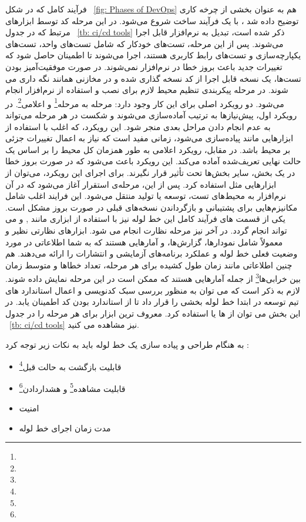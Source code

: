 فرآیند کامل  که در شکل
~\ref{fig: Phases of DevOps}
هم به عنوان بخشی از چرخه کاری توضیح داده شد \cite{DevopsCD}، با یک فرآیند ساخت شروع می‌شود. در این مرحله کد توسط ابزارهای مرتبط که در جدول
~\ref{tb: ci/cd tools}
ذکر شده است، تبدیل به نرم‌افزار قابل اجرا می‌شوند. پس از این مرحله، تست‌های خودکار که شامل تست‌های واحد، تست‌های یکپارچه‌سازی و تست‌های رابط کاربری هستند، اجرا می‌شوند تا اطمینان حاصل شود که تغییرات جدید باعث بروز خطا در نرم‌افزار نمی‌شوند. در صورت موفقیت‌آمیز بودن تست‌ها، یک نسخه قابل اجرا از کد نسخه گذاری شده و در مخازنی همانند  نگه داری می شوند. 
در مرحله پیکربندی تنظیم محیط لازم برای نصب و استفاده از نرم‌افزار انجام می‌شود. دو رویکرد اصلی برای این کار وجود دارد: مرحله به مرحله\footnote{} و اعلامی\footnote{ }. در رویکرد اول، پیش‌نیازها به ترتیب آماده‌سازی می‌شوند و شکست در هر مرحله می‌تواند به عدم انجام دادن مراحل بعدی منجر شود. این رویکرد، که اغلب با استفاده از ابزارهایی مانند  پیاده‌سازی می‌شود، زمانی مفید است که نیاز به اعمال تغییرات جزئی بر محیط باشد. در مقابل، رویکرد اعلامی به طور همزمان کل محیط را بر اساس یک حالت نهایی تعریف‌شده آماده می‌کند. این رویکرد باعث می‌شود که در صورت بروز خطا در یک بخش، سایر بخش‌ها تحت تأثیر قرار نگیرند. برای اجرای این رویکرد، می‌توان از ابزارهایی مثل  استفاده کرد\cite{Devopsgitops}.
پس از این، مرحله‌ی استقرار آغاز می‌شود که در آن نرم‌افزار به محیط‌های تست،  توسعه یا تولید منتقل می‌شود. این فرایند اغلب شامل مکانیزم‌هایی برای پشتیبانی و بازگرداندن نسخه‌های قبلی در صورت بروز مشکل است. یکی از قسمت های 
فرآیند کامل این خط لوله نیز با استفاده از ابزاری مانند 
,  و 
 می تواند انجام گردد. 
 در آخر نیز مرحله نظارت انجام می شود. ابزارهای نظارتی نظیر  و  معمولاً شامل نمودارها، گزارش‌ها، و آمارهایی هستند که به شما اطلاعاتی در مورد وضعیت فعلی خط لوله و عملکرد برنامه‌های آزمایشی و انتشارات را ارائه می‌دهند. هم چنین اطلاعاتی مانند زمان طول کشیده برای هر مرحله، تعداد خطاها و متوسط زمان بین خرابی‌ها\footnote{} از جمله آمارهایی هستند که ممکن است در این مرحله نمایش داده شوند. لازم به ذکر است که می توان به منظور بررسی سبک کدنویسی و اعمال استاندارد های تیم توسعه در ابتدا خط لوله بخشی را قرار داد تا از استاندارد بودن کد اطمینان یابد. در این بخش می توان از  ها یا  استفاده کرد. معروف ترین ابزار برای هر مرحله را در جدول
 ~\ref{tb: ci/cd tools}
 نیز مشاهده می کنید.
 
به هنگام طراحی و پیاده سازی یک خط لوله  باید به نکات زیر توجه کرد \cite{DevopsCD, Devopsgitops, DevopsCICD2}:
\begin{itemize}

	\item 
قابلیت بازگشت به حالت قبل\footnote{} 
	\item 
قابلیت مشاهده\footnote{} و هشداردادن\footnote{}
	\item
امنیت
	\item 
مدت زمان اجرای خط لوله
\end{itemize}

